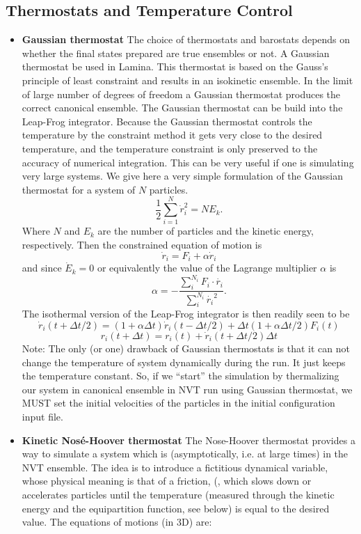 \documentclass[a4paper,10pt]{article}
\begin{document}
\begin{itemize}
\subsection*{Thermostats and Temperature Control}
\begin{itemize}
\item \textbf{Gaussian thermostat}
The choice of thermostats and barostats depends on whether the final states prepared are true ensembles or not.
A Gaussian thermostat be used in Lamina. This thermostat is based on the Gauss's principle of least constraint 
and results in an isokinetic ensemble. In the limit of large number of degrees of freedom a Gaussian thermostat produces 
the correct canonical ensemble. The Gaussian thermostat can be build into the Leap-Frog integrator. Because the Gaussian 
thermostat controls the temperature by the constraint method it gets very close to the desired temperature, and the 
temperature constraint is only preserved to the accuracy of numerical integration. This can be very useful if one is 
simulating very large systems. We give here a very simple formulation of the Gaussian thermostat for a system of $N$ 
particles.
\begin{equation}
\frac{1}{2}\sum_{i=1}^{N} \dot{r}_i^2 = N E_k.
\end{equation}
Where $N$ and $E_k$ are the number of particles and the kinetic energy, respectively. Then the constrained equation of 
motion is
\begin{equation}
\dot{r}_i = F_i + \alpha \dot{r}_i
\end{equation}
and since $\dot{E}_k = 0$ or equivalently the value of the Lagrange multiplier $\alpha$ is
\begin{equation}
\alpha = -\frac{\sum_{i}^{N_i} F_i \cdot \dot{r_i}}{\sum_{i}^{N_i} \dot{r_i}^2}.
\end{equation}
The isothermal version of the Leap-Frog integrator is then readily seen to be
\begin{equation}
\dot{r}_i(t + \Delta t/2) = (1 + \alpha \Delta t) \dot{r}_i(t - \Delta t/2) + \Delta t (1 + \alpha \Delta t / 2) F_i(t)
\end{equation}
\begin{equation}
r_i(t + \Delta t) = r_i(t) + \dot{r}_i(t + \Delta t/2) \Delta t
\end{equation}
Note: The only (or one) drawback of Gaussian thermostats is that it can not change the temperature of system dynamically during 
the run. It just keeps the temperature constant. So, if we ``start'' the simulation by thermalizing our system in 
canonical ensemble in NVT run using Gaussian thermostat, we MUST set the initial velocities of the particles in the 
initial configuration input file.
\item \textbf{Kinetic Nos\'e-Hoover thermostat}
The Nose-Hoover thermostat provides a way to simulate a system which
is (asymptotically, i.e. at large times) in the NVT ensemble. 
The idea is
to introduce a fictitious dynamical variable, whose physical meaning is that
of a friction, (, which slows down or accelerates particles until the temperature
(measured through the kinetic energy and the equipartition function, see below)
is equal to the desired value. The equations of motions (in 3D) are:


\end{itemize}
\end{itemize}
\end{document}
